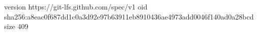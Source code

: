 version https://git-lfs.github.com/spec/v1
oid sha256:a8eac0f687dd1c0a3d92e97b63911eb8910436ae4973add0046f140ad0a28bcd
size 409
